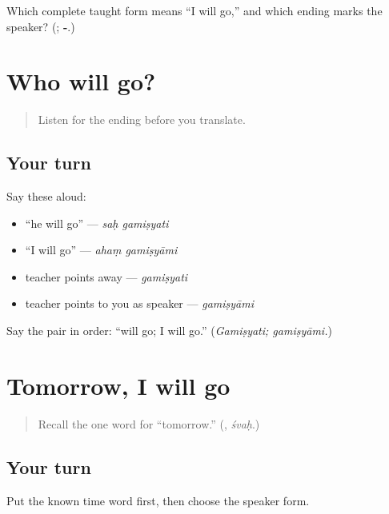 \begin{tcolorbox}[breakable,colback=teal!4,colframe=teal!35!black,title={Before you move on}]
Which complete taught form means “I will go,” and which ending marks the speaker? (\textbf{}; \textbf{-}.)
\end{tcolorbox}
\section[Practice]{Who will go?}

\label{lesson:SA-C263-future-person-contrast}



\begin{quote}
Listen for the ending before you translate.
\end{quote}

\subsection*{Your turn}
Say these aloud:

\begin{itemize}
\raggedright
  \item “he will go” — \emph{saḥ gamiṣyati}
  \item “I will go” — \emph{ahaṃ gamiṣyāmi}
  \item teacher points away — \emph{gamiṣyati}
  \item teacher points to you as speaker — \emph{gamiṣyāmi}
\end{itemize}

\begin{tcolorbox}[breakable,colback=teal!4,colframe=teal!35!black,title={Before you move on}]
Say the pair in order: “will go; I will go.” (\emph{Gamiṣyati; gamiṣyāmi.})
\end{tcolorbox}
\section[Practice]{Tomorrow, I will go}

\label{lesson:SA-C263-tomorrow-going-recall}



\begin{quote}
Recall the one word for “tomorrow.” (\textbf{}, \emph{śvaḥ}.)
\end{quote}

\subsection*{Your turn}
Put the known time word first, then choose the speaker form.

